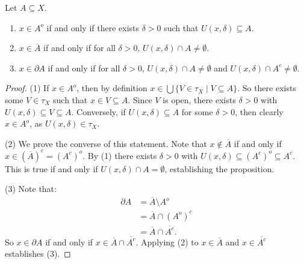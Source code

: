     \begin{proposition}\label{prop:interior-closure-boundary-property}
        Let $A \subseteq X$.
        \begin{enumerate}[label = (\arabic*),itemsep=1pt,topsep=3pt]
            \item $x \in A^o$ if and only if there exists $\delta > 0$ such that $U(x , \delta) \subseteq A$.
            \item $x \in \overline{A}$ if and only if for all $\delta > 0$, $U(x,\delta) \cap A \neq \emptyset$.
            \item $x \in \partial A$ if and only if for all $\delta > 0$, $U(x,\delta) \cap A \neq \emptyset$ and $U(x,\delta) \cap A^c \neq \emptyset$.
        \end{enumerate}
    \end{proposition}
        \begin{proof}
            
            (1) If $x \in A^o$, then by definition $x \in \bigcup \{V \in \tau_X \mid V \subseteq A\}.$ So there exists some $V \in \tau_X$ such that $x \in V \subseteq A$. Since $V$ is open, there exists $\delta > 0$ with $U(x,\delta) \subseteq V \subseteq A$. Conversely, if $U(x,\delta) \subseteq A$ for some $\delta > 0$, then clearly $x \in A^o$, as $U(x,\delta) \in \tau_X$.

            (2) We prove the converse of this statement. Note that $x \not\in \overline{A}$ if and only if $x \in (\overline{A})^c = (A^c)^o$. By (1) there exists $\delta > 0$ with $U(x,\delta) \subseteq (A^c)^o \subseteq A^c$. This is true if and only if $U(x,\delta) \cap A = \emptyset$, establishing the proposition.

            (3) Note that:
                \begin{equation*}
                \begin{split}
                    \partial A 
                    & = \overline{A} \setminus{A^o} \\
                    & = \overline{A} \cap (A^o)^c \\
                    & = \overline{A} \cap \overline{A^c}.
                \end{split}
                \end{equation*}
            So $x \in \partial A$ if and only if $x \in \overline{A} \cap \overline{A^c}$. Applying (2) to $x \in \overline{A}$ and $x \in \overline{A^c}$ establishes (3).
        \end{proof}


